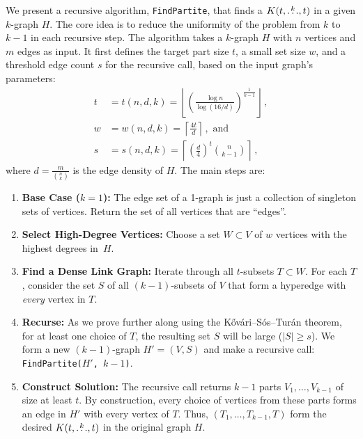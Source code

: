 We present a recursive algorithm, \texttt{FindPartite}, that finds a $K(t, \overset{k}{\dots}, t)$ in a given $k$-graph $H$.
The core idea is to reduce the uniformity of the problem from $k$ to $k-1$ in each recursive step.
The algorithm takes a $k$-graph $H$ with $n$ vertices and $m$ edges as input.
It first defines the target part size $t$, a small set size $w$,
and a threshold edge count $s$ for the recursive call, based on the input graph's parameters:
\begin{align*}
    t &= t(n, d, k) = \left\lfloor \left( \frac{\log n}{\log (16/d)}  \right)^{\frac{1}{k-1}} \right \rfloor\,, \\
    w &= w(n, d, k) = \left\lceil \frac{4 t}{d} \right\rceil\,, \text{ and } \\
    s &= s(n, d, k) = \left\lceil \left( \frac{d}{4} \right)^t \binom{n}{k-1} \right\rceil\,,
\end{align*}
where $d = \frac{m}{\binom{n}{k}}$ is the edge density of $H$.
The main steps are:
\begin{enumerate}
    \item \textbf{Base Case ($k=1$):} The edge set of a 1-graph is just a collection of singleton sets of vertices.
    Return the set of all vertices that are ``edges''.

    \item \textbf{Select High-Degree Vertices:} Choose a set $W \subset V$ of $w$ vertices with the highest degrees in~$H$. \label{W}

    \item \textbf{Find a Dense Link Graph:} Iterate through all $t$-subsets $T \subset W$.
    For each $T$, consider the set $S$ of all $(k-1)$-subsets of $V$ that form a hyperedge with \emph{every} vertex in $T$. \label{link}

    \item \textbf{Recurse:} As we prove further along using the Kőv\'{a}ri–S\'{o}s–Tur\'{a}n theorem, for at least one choice of $T$,
    the resulting set $S$ will be large ($|S| \ge s$). We form a new $(k-1)$-graph $H'=(V, S)$ and make a recursive call: \texttt{FindPartite($H'$, $k-1$)}.

    \item \textbf{Construct Solution:} The recursive call returns $k-1$ parts $V_1, \dots, V_{k-1}$ of size at least $t$.
    By construction, every choice of vertices from these parts forms an edge in $H'$ with every vertex of $T$.
    Thus, $(T_1, \dots, T_{k-1}, T)$ form the desired $K(t, \overset{k}{\dots}, t)$ in the original graph $H$.

\end{enumerate}

